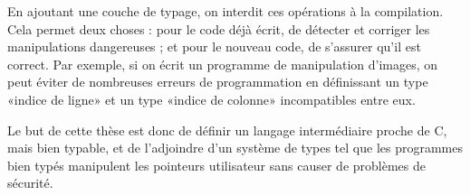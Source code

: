 En ajoutant une couche de typage, on interdit ces opérations à la compilation.
Cela permet deux choses : pour le code déjà écrit, de détecter et corriger les
manipulations dangereuses ; et pour le nouveau code, de s'assurer qu'il est
correct. Par exemple, si on écrit un programme de manipulation d'images, on peut
éviter de nombreuses erreurs de programmation en définissant un type «indice de
ligne» et un type «indice de colonne» incompatibles entre eux.

Le but de cette thèse est donc de définir un langage intermédiaire proche de C,
mais bien typable, et de l'adjoindre d'un système de types tel que les
programmes bien typés manipulent les pointeurs utilisateur sans causer de
problèmes de sécurité.



